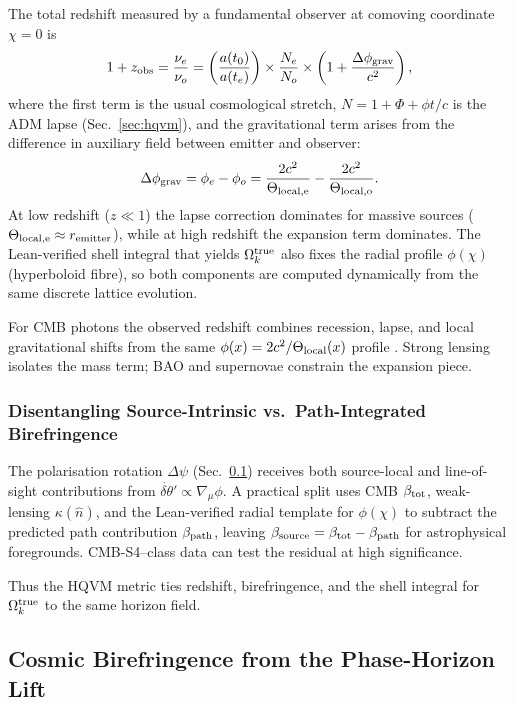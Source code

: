 \documentclass[12pt,a4paper]{article}
\begin{document}
The total redshift measured by a fundamental observer at comoving coordinate \(\chi = 0\) is
\[
1 + z_{\rm obs} = \frac{\nu_e}{\nu_o} = \left( \frac{a(t_0)}{a(t_e)} \right) \times \frac{N_e}{N_o} \times \left( 1 + \frac{\Delta\phi_{\rm grav}}{c^2} \right),
\]
where the first term is the usual cosmological stretch, \(N = 1 + \Phi + \phi t / c\) is the ADM lapse (Sec.~\ref{sec:hqvm}), and the gravitational term arises from the difference in auxiliary field between emitter and observer:
\[
\Delta\phi_{\rm grav} = \phi_e - \phi_o = \frac{2c^2}{\Theta_{\rm local,e}} - \frac{2c^2}{\Theta_{\rm local,o}}.
\]
At low redshift (\(z \ll 1\)) the lapse correction dominates for massive sources (\(\Theta_{\rm local,e} \approx r_{\rm emitter}\)), while at high redshift the expansion term dominates. The Lean-verified shell integral that yields \(\Omega_k^{\rm true}\) \citep{hqiv-lean} also fixes the radial profile \(\phi(\chi)\) (hyperboloid fibre), so both components are computed dynamically from the same discrete lattice evolution.

For CMB photons the observed redshift combines recession, lapse, and local gravitational shifts from the same \(\phi(x)=2c^2/\Theta_{\rm local}(x)\) profile \citep{hqiv-lean}. Strong lensing isolates the mass term; BAO and supernovae constrain the expansion piece.

\subsubsection{Disentangling Source-Intrinsic vs.\ Path-Integrated Birefringence}
The polarisation rotation \(\Delta\psi\) (Sec.~\ref{sec:cmb-birefringence}) receives both source-local and line-of-sight contributions from \(\dot{\delta\theta}' \propto \nabla_\mu \phi\). A practical split uses CMB \(\beta_{\rm tot}\), weak-lensing \(\kappa(\hat{n})\), and the Lean-verified radial template for \(\phi(\chi)\) \citep{hqiv-lean} to subtract the predicted path contribution \(\beta_{\rm path}\), leaving \(\beta_{\rm source} = \beta_{\rm tot} - \beta_{\rm path}\) for astrophysical foregrounds. CMB-S4--class data can test the residual at high significance.

Thus the HQVM metric ties redshift, birefringence, and the shell integral for \(\Omega_k^{\rm true}\) to the same horizon field.

\subsection{Cosmic Birefringence from the Phase-Horizon Lift}
\label{sec:cmb-birefringence}
\end{document}
